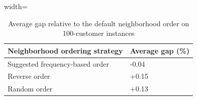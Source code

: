 \documentclass{article}
\begin{document}
\begin{table}[ht]
\centering
\footnotesize
\setlength{\tabcolsep}{4pt}
\caption{Average gap relative to the default neighborhood order on 100-customer instances}
\vspace{3mm}
\begin{adjustbox}{width=\textwidth}
\begin{tabular}{l l}
\toprule
\textbf{Neighborhood ordering strategy} & \textbf{Average gap (\%)} \\
\midrule
Suggested frequency-based order  & -0.04 \\
Reverse order & +0.15 \\
Random order & +0.13 \\
\bottomrule
\end{tabular}
\end{adjustbox}
\label{tab:bf_summary}
\end{table}
\end{document}
